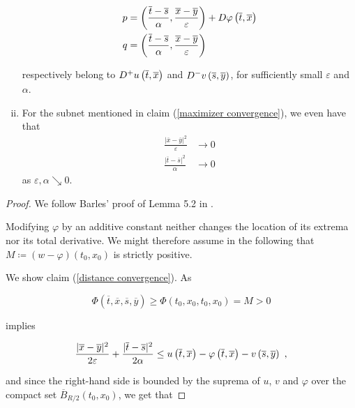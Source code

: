 \begin{lemma}
\begin{enumerate}[(i)]
		 		\begin{align*}
		 			p &= \left( \frac{\overline{t} - \overline{s}}{\alpha}, \frac{\overline{x} - \overline{y}}{\varepsilon} \right) + D\varphi\left(\overline{t}, \overline{x}\right) \\
		 			q &= \left( \frac{\overline{t} - \overline{s}}{\alpha}, \frac{\overline{x} - \overline{y}}{\varepsilon} \right)
		 		\end{align*}
		 		
		 		respectively belong to $ D^{+}u\left(\overline{t}, \overline{x}\right) $ and $ D^{-}v\left(\overline{s}, \overline{y}\right) $, for sufficiently small $ \varepsilon $ and $ \alpha $.
		 		
		 		\item
		 		\label{fast convergence}
		 		For the subnet mentioned in claim (\ref{maximizer convergence}), we even have that
		 		\begin{align*}
		 			\frac{\lvert \overline{x} - \overline{y} \rvert^2}{\varepsilon} &\to 0 \\
		 			\frac{\lvert \overline{t} - \overline{s} \rvert^2}{\alpha} &\to 0 
		 		\end{align*} 
		 		as $ \varepsilon, \alpha \searrow 0 $.
		 	\end{enumerate}
	 	
	 	\begin{proof}
	 		We follow Barles' proof of Lemma 5.2 in \cite[p.~69]{barles}.
	 		
	 	 Modifying $ \varphi $ by an additive constant neither changes the location of its extrema nor its total derivative. We might therefore assume in the following that $ M \coloneqq (w - \varphi)(t_0, x_0)  $ is strictly positive.
	 		
	 		We show claim (\ref{distance convergence}). As
	 		
	 		\begin{equation}
	 			\label{larger maximum}
	 			\Phi(\overline{t}, \overline{x}, \overline{s}, \overline{y}) \geq \Phi(t_0, x_0, t_0, x_0) = M > 0
	 		\end{equation}
	 		
	 		implies
	 		
	 		\begin{equation*}
	 			\frac{\lvert \overline{x} - \overline{y} \rvert^2 }{2 \varepsilon} + \frac{\lvert \overline{t} - \overline{s} \rvert^2}{2 \alpha} \leq u\left(\overline{t}, \overline{x}\right) - \varphi\left(\overline{t}, \overline{x}\right) - v\left(\overline{s}, \overline{y}\right) \ ,
	 		\end{equation*}
	 		
	 		and since the right-hand side is bounded by the suprema of $ u $, $ v $ and $ \varphi $ over the compact set $ \overline{B}_{R / 2}(t_0, x_0) $, we get that
	 		

\end{proof}
\end{lemma}
